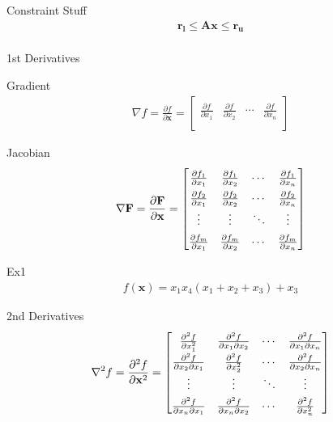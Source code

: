 \documentclass{article}
\begin{document}
Constraint Stuff
\begin{align*}
    \mathbf{r_l} \le \mathbf{Ax} \le \mathbf{r_u}\\
\end{align*}

1st Derivatives

Gradient
\begin{align*}
    \nabla f = \frac{\partial f}{\partial \mathbf{x}} =
        \begin{bmatrix}
            \frac{\partial f}{\partial x_1} & \frac{\partial f}{\partial x_2} & \cdots & \frac{\partial f}{\partial x_n}\\
        \end{bmatrix}
\end{align*}

Jacobian
\begin{align*}
    \renewcommand\arraystretch{1.5}
    \nabla \mathbf{F} = \frac{\partial \mathbf{F}}{\partial \mathbf{x}} =
        \begin{bmatrix}
            \frac{\partial f_1}{\partial x_1} & \frac{\partial f_1}{\partial x_2} & \cdots & \frac{\partial f_1}{\partial x_n}\\
            \frac{\partial f_2}{\partial x_1} & \frac{\partial f_2}{\partial x_2} & \cdots & \frac{\partial f_2}{\partial x_n}\\
            \vdots & \vdots & \ddots & \vdots\\
            \frac{\partial f_m}{\partial x_1} & \frac{\partial f_m}{\partial x_2} & \cdots & \frac{\partial f_m}{\partial x_n}\\
        \end{bmatrix}
\end{align*}

Ex1
\begin{align*}
    f(\mathbf{x}) = x_1 x_4 (x_1 + x_2 + x_3) + x_3
\end{align*}

2nd Derivatives
\begin{align*}
    \renewcommand\arraystretch{1.5}
    \nabla^2 f = \frac{\partial^2 f}{\partial \mathbf{x}^2} =
        \begin{bmatrix}
            \frac{\partial^2 f}{\partial x_1^2} & \frac{\partial^2 f}{\partial x_1 \partial x_2} & \cdots & \frac{\partial^2 f}{\partial x_1 \partial x_n}\\
            \frac{\partial^2 f}{\partial x_2 \partial x_1} & \frac{\partial^2 f}{\partial x_2^2} & \cdots & \frac{\partial^2 f}{\partial x_2 \partial x_n}\\
            \vdots & \vdots & \ddots & \vdots\\
            \frac{\partial^2 f}{\partial x_n \partial x_1} & \frac{\partial^2 f}{\partial x_n \partial x_2} & \cdots & \frac{\partial^2 f}{\partial x_n^2}\\
        \end{bmatrix}
\end{align*}
\end{document}

